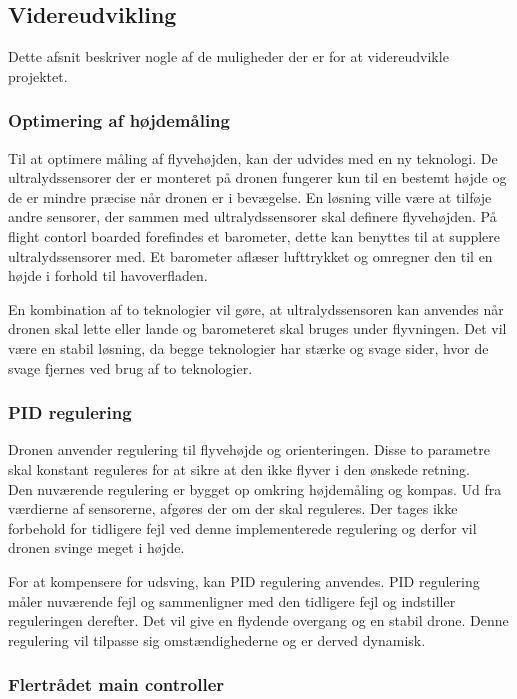 \subsection{Videreudvikling}

Dette afsnit beskriver nogle af de muligheder der er for at videreudvikle projektet. 

\subsubsection*{Optimering af højdemåling}

Til at optimere måling af flyvehøjden, kan der udvides med en ny teknologi. De ultralydssensorer der er monteret på dronen fungerer kun til en bestemt højde og de er mindre præcise når dronen er i bevægelse. En løsning ville være at tilføje andre sensorer, der sammen med ultralydssensorer skal definere flyvehøjden. På flight contorl boarded forefindes et barometer, dette kan benyttes til at supplere ultralydssensorer med.
Et barometer aflæser lufttrykket og omregner den til en højde i forhold til havoverfladen.

En kombination af to teknologier vil gøre, at ultralydssensoren kan anvendes når dronen skal lette eller lande og barometeret skal bruges under flyvningen. Det vil være en stabil løsning, da begge teknologier har stærke og svage sider, hvor de svage fjernes ved brug af to teknologier.

\subsubsection*{PID regulering}

Dronen anvender regulering til flyvehøjde og orienteringen. Disse to parametre skal konstant reguleres for at sikre at den ikke flyver i den ønskede retning. \\
Den nuværende regulering er bygget op omkring højdemåling og kompas. Ud fra værdierne af sensorerne, afgøres der om der skal reguleres. Der tages ikke forbehold for tidligere fejl ved denne implementerede regulering og derfor vil dronen svinge meget i højde.

For at kompensere for udsving, kan PID regulering anvendes. PID regulering måler nuværende fejl og sammenligner med den tidligere fejl og indstiller reguleringen derefter. Det vil give en flydende overgang og en stabil drone. Denne regulering vil tilpasse sig omstændighederne og er derved dynamisk.

\subsubsection*{Flertrådet main controller}

